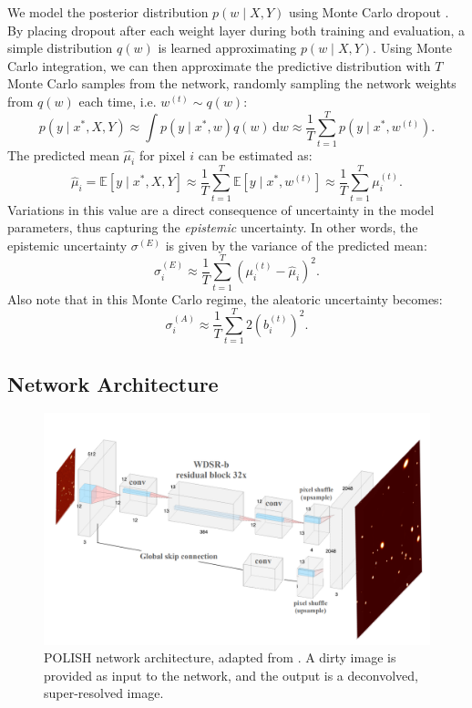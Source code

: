 \documentclass{article}
\begin{document}
We model the posterior distribution $p(w \mid X, Y)$ using Monte Carlo dropout \cite{gal2016dropout}. By placing dropout after each weight layer during both training and evaluation, a simple distribution $q(w)$ is learned approximating $p(w \mid X, Y)$. Using Monte Carlo integration, we can then approximate the predictive distribution with $T$ Monte Carlo samples from the network, randomly sampling the network weights from $q(w)$ each time, i.e. $w^{(t)} \sim q(w)$:
\begin{equation}
    p(y \mid x^\ast, X, Y) \approx \int p(y \mid x^\ast, w)q(w)\, \mathrm{d}w \approx \frac{1}{T}\sum_{t=1}^T p(y\mid x^\ast, w^{(t)}).
\end{equation}
The predicted mean $\hat{\mu_i}$ for pixel $i$ can be estimated as:
\begin{equation}
    \hat{\mu}_i = \mathbb{E}[y \mid x^\ast, X, Y] \approx \frac{1}{T} \sum_{t=1}^T \mathbb{E}[y\mid x^\ast, w^{(t)}] \approx \frac{1}{T}\sum_{t=1}^T \mu^{(t)}_i.
\end{equation}
Variations in this value are a direct consequence of uncertainty in the model parameters, thus capturing the \textit{epistemic} uncertainty. In other words, the epistemic uncertainty $\sigma^{(E)}$ is given by the variance of the predicted mean:
\begin{equation}
\label{eq:sig_e}
    \sigma^{(E)}_i \approx \frac{1}{T}\sum_{t=1}^T (\mu^{(t)}_i - \hat{\mu}_i)^2.
\end{equation}
Also note that in this Monte Carlo regime, the aleatoric uncertainty becomes:
\begin{equation}
\label{eq:sig_a}
    \sigma^{(A)}_i \approx \frac{1}{T}\sum_{t=1}^T 2(b^{(t)}_i)^2.
\end{equation}

\subsection{Network Architecture}

\begin{figure}
    \centering
    \includegraphics[width=0.8\linewidth]{img/POLISH.png}
    \caption{POLISH network architecture, adapted from \citet{Yu2018}. A dirty image is provided as input to the network, and the output is a deconvolved, super-resolved image.}
    \label{fig:polish}
\end{figure}
\end{document}
